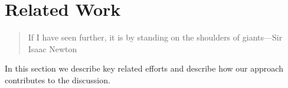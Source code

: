 \section{Related Work}
  
  \begin{quote}
    If I have seen further, it is by standing on the
    shoulders of giants---Sir Isaac Newton
  \end{quote}

  In this section we describe key related efforts and
  describe how our approach contributes to the discussion.

